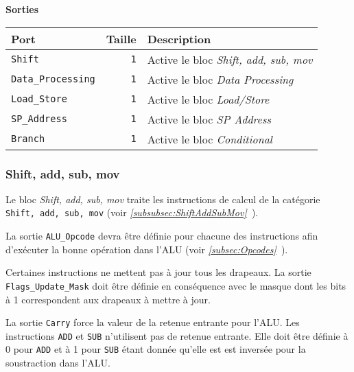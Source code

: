 \documentclass{article}
\begin{document}
    \vspace{1em}
    \textbf{Sorties}\\

    \begin{tabular}{|l|r|l|}
        \hline
        \textbf{Port}             & \textbf{Taille} & \textbf{Description}                         \\
        \hline

        \texttt{Shift}            & \texttt{1}      & Active le bloc \textit{Shift, add, sub, mov} \\
        \hline
        \texttt{Data\_Processing} & \texttt{1}      & Active le bloc \textit{Data Processing}      \\
        \hline
        \texttt{Load\_Store}      & \texttt{1}      & Active le bloc \textit{Load/Store}           \\
        \hline
        \texttt{SP\_Address}      & \texttt{1}      & Active le bloc \textit{SP Address}           \\
        \hline
        \texttt{Branch}           & \texttt{1}      & Active le bloc \textit{Conditional}          \\

        \hline
    \end{tabular}

    \subsubsection{Shift, add, sub, mov}
    \label{sec:SASM}

    Le bloc \textit{Shift, add, sub, mov} traite les instructions de calcul de la catégorie \texttt{Shift, add, sub, mov} (voir \textit{\ref{subsubsec:ShiftAddSubMov}~}).

    La sortie \texttt{ALU\_Opcode} devra être définie pour chacune des instructions afin d'exécuter la bonne opération dans l'ALU (voir \textit{\ref{subsec:Opcodes}~}).

    Certaines instructions ne mettent pas à jour tous les drapeaux.
    La sortie \texttt{Flags\_Update\_Mask} doit être définie en conséquence avec le masque dont les bits à 1 correspondent aux drapeaux à mettre à jour.

    La sortie \texttt{Carry} force la valeur de la retenue entrante pour l'ALU. Les instructions \texttt{ADD} et \texttt{SUB} n'utilisent pas de retenue entrante.
    Elle doit être définie à 0 pour \texttt{ADD} et à 1 pour \texttt{SUB} étant donnée qu'elle est est inversée pour la soustraction dans l'ALU.
\end{document}
